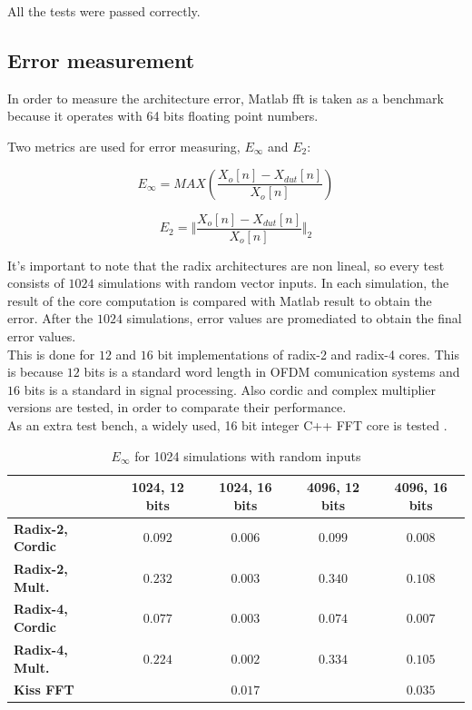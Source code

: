\documentclass[conference]{IEEEtran}
\begin{document}
All the tests were passed correctly.

\subsection{Error measurement}

In order to measure the architecture error, Matlab fft is taken as a benchmark because it operates with 64 bits floating point numbers.

Two metrics are used for error measuring, $E_\infty$ and $E_2$:

\begin{equation}
E_\infty = MAX(\frac{ X_o[n] - X_{dut}[n]}{X_o[n]})
\label{eq:norma1}
\end{equation}

\begin{equation}
E_2 = \Vert\frac{X_o[n] - X_{dut}[n]}{X_o[n]}\Vert_2
\label{eq:norma2}
\end{equation}
 
It's important to note that the radix architectures are non lineal, so every test consists of $1024$ simulations with random vector inputs.
In each simulation, the result of the core computation is compared with Matlab result to obtain the error. After the $1024$ simulations, 
error values are promediated to obtain the final error values.\\
This is done for $12$ and $16$ bit implementations of radix-2 and radix-4 cores. This is because $12$ bits is a standard word length in OFDM comunication systems 
and $16$ bits is a standard in signal processing. Also cordic and complex multiplier versions are tested, in order to comparate their performance.\\
As an extra test bench, a widely used, 16 bit integer C++ FFT core is tested \cite{KISSFFT}.

\begin{table}[htb!]
\begin{tabular}{l c c c c}
 & \textbf{1024, 12 bits} & \textbf{1024, 16 bits} & \textbf{4096, 12 bits} & \textbf{4096, 16 bits}\\ \hline 
\textbf{Radix-2, Cordic} & $0.092$ & $0.006$ & $0.099$ & $0.008 $\\
\textbf{Radix-2, Mult.} & $0.232$ & $0.003$ & $0.340$ & $0.108$\\
\textbf{Radix-4, Cordic} & $0.077$ & $0.003$ & $0.074$ & $0.007$\\
\textbf{Radix-4, Mult.} & $0.224$ & $0.002$ & $0.334$ & $0.105$\\
\textbf{Kiss FFT} & $ $ & $0.017$ & $ $ & $0.035$\\\hline
\end{tabular}
\caption{$E_\infty$ for 1024 simulations with random inputs}
\label{table:errorInf}
\end{table}
\end{document}
